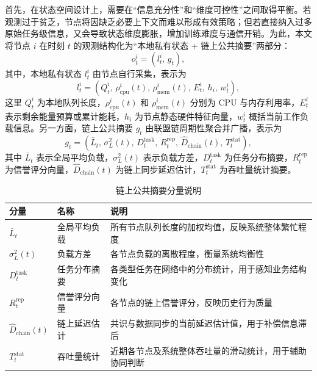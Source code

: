 \documentclass[UTF8,12pt,oneside]{ctexbook}
\begin{document}
首先，在状态空间设计上，需要在“信息充分性”和“维度可控性”之间取得平衡。若观测过于贫乏，节点将因缺乏必要上下文而难以形成有效策略；但若直接纳入过多原始任务级信息，又会导致状态维度膨胀，增加训练难度与通信开销。为此，本文将节点 $i$ 在时刻 $t$ 的观测结构化为“本地私有状态 + 链上公共摘要”两部分：
\begin{equation}
  o_t^i = \left(l_t^i,\,g_t\right),
  \label{eq:obs_split}
\end{equation}
其中，本地私有状态 $l_t^i$ 由节点自行采集，表示为
\begin{equation}
  l_t^i = \left(Q_t^i,\,\rho_{\mathrm{cpu}}^i(t),\,\rho_{\mathrm{mem}}^i(t),\,E_t^i,\,h_i,\,w_t^i\right),
  \label{eq:local_state}
\end{equation}
这里 $Q_t^i$ 为本地队列长度，$\rho_{\mathrm{cpu}}^i(t)$ 和 $\rho_{\mathrm{mem}}^i(t)$ 分别为 CPU 与内存利用率，$E_t^i$ 表示剩余能量预算或累计能耗，$h_i$ 为节点静态硬件特征向量，$w_t^i$ 概括当前工作负载信息。另一方面，链上公共摘要 $g_t$ 由联盟链周期性聚合并广播，表示为
\begin{equation}
  g_t = \left(\bar{L}_t,\,\sigma_L^2(t),\,D_t^{\mathrm{task}},\,R_t^{\mathrm{rep}},\,\hat{D}_{\mathrm{chain}}(t),\,T_t^{\mathrm{stat}}\right),
  \label{eq:global_summary}
\end{equation}
其中 $\bar{L}_t$ 表示全局平均负载，$\sigma_L^2(t)$ 表示负载方差，$D_t^{\mathrm{task}}$ 为任务分布摘要，$R_t^{\mathrm{rep}}$ 为信誉评分向量，$\hat{D}_{\mathrm{chain}}(t)$ 为链上同步延迟估计，$T_t^{\mathrm{stat}}$ 为吞吐量统计摘要。

\begin{table}[H]
\centering
\caption{链上公共摘要分量说明}
\label{tab:summary}
\begin{tabularx}{\textwidth}{C{2.3cm}C{2.2cm}Y}
\toprule
分量 & 名称 & 说明 \\
\midrule
$\bar{L}_t$ & 全局平均负载 & 所有节点队列长度的加权均值，反映系统整体繁忙程度 \\
$\sigma_L^2(t)$ & 负载方差 & 各节点负载的离散程度，衡量系统均衡性 \\
$D_t^{\mathrm{task}}$ & 任务分布摘要 & 各类型任务在网络中的分布统计，用于感知业务结构变化 \\
$R_t^{\mathrm{rep}}$ & 信誉评分向量 & 各节点的链上信誉评分，反映历史行为质量 \\
$\hat{D}_{\mathrm{chain}}(t)$ & 链上延迟估计 & 共识与数据同步的当前延迟估计值，用于补偿信息滞后 \\
$T_t^{\mathrm{stat}}$ & 吞吐量统计 & 近期各节点及系统整体吞吐量的滑动统计，用于辅助协同判断 \\
\bottomrule
\end{tabularx}
\end{table}
\end{document}
